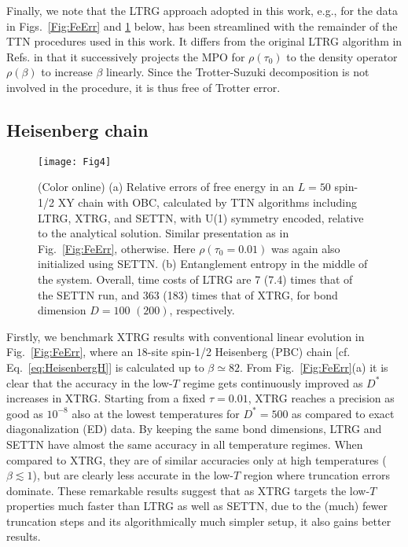 \documentclass[aps,prx,twocolumn,showpacs,psfig,superscriptaddress,longbibliography]{revtex4-1}
\newcommand{\Eq}[1]{Eq.~\eqref{#1}}
\newcommand{\Fig}[1]{Fig.~\ref{#1}}
\def\Dstar{D^\ast}
\def\taui{\tau_0}
\begin{document}
Finally, we note that the LTRG approach adopted in this work, e.g.,
for the data in Figs.~\ref{Fig:FeErr} and \ref{Fig:FeErrXY} below,
has been streamlined with the remainder of the TTN procedures used
in this work.  It differs from the original LTRG algorithm in Refs.
\cite{Li.w+:2011:LTRG, Dong.y+:2017:BiLTRG} in that it successively
projects the MPO for $\rho(\taui)$ to the density operator
$\rho(\beta)$ to increase $\beta$ linearly. Since the
Trotter-Suzuki decomposition is not involved in the procedure, it
is thus free of Trotter error.

\subsection{Heisenberg chain \label{sec:HChain}}

 \begin{figure}[tbp]
\texttt{[image: Fig4]}
\caption{(Color online)
   (a) Relative errors of free energy
   in an $L=50$ spin-1/2 XY chain with OBC,
   calculated by TTN algorithms including LTRG,  XTRG, 
   and SETTN, with U(1) symmetry encoded,
   relative to the analytical solution.
   Similar presentation as in \Fig{Fig:FeErr}, otherwise.
   Here $\rho(\taui=0.01)$ was again also initialized
   using SETTN.
   (b) Entanglement entropy in the middle of the system. 
   Overall, time costs of LTRG are 7 (7.4) times that
   of the SETTN run, and 363 (183) times that of XTRG, 
   for bond dimension $D=100$ $(200)$,
   respectively.
}
\label{Fig:FeErrXY}
\end{figure}

Firstly, we benchmark XTRG results with conventional linear
evolution in Fig.~\ref{Fig:FeErr}, where an $18$-site spin-1/2
Heisenberg (PBC) chain [cf.  \Eq{eq:HeisenbergH}] is calculated up
to $\beta \simeq 82$.  From Fig.~\ref{Fig:FeErr}(a) it is clear that
the accuracy in the low-$T$ regime gets continuously improved as
$\Dstar$ increases in XTRG. Starting from a fixed $\tau=0.01$, XTRG
reaches a precision as good as $10^{-8}$ also at the lowest
temperatures for $\Dstar=500$ as compared to exact diagonalization
(ED) data.  By keeping the same bond dimensions, LTRG and SETTN have
almost the same accuracy in all temperature regimes.  When compared
to XTRG, they are of similar accuracies only at high temperatures
($\beta \lesssim 1$), but are clearly less accurate in the low-$T$
region where truncation errors dominate. These remarkable results
suggest that as XTRG targets the low-$T$ properties much faster than
LTRG as well as SETTN, due to the (much) fewer truncation steps and
its algorithmically much simpler setup, it also gains better
results.
\end{document}
